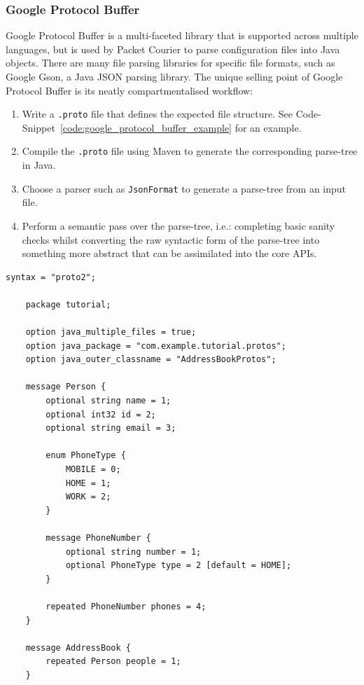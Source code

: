 \subsubsection{Google Protocol Buffer}\label{subsubsection:google_protocol_buffer}

Google Protocol Buffer\cite{google_protobuf} is a multi-faceted library that is supported across multiple languages,
but is used by Packet Courier to parse configuration files into Java objects. There are many file parsing libraries
for specific file formats, such as Google Gson, a Java JSON parsing library\cite{google_gson}. The unique selling
point of Google Protocol Buffer is its neatly compartmentalised workflow:
\begin{enumerate}
    \item Write a \texttt{.proto} file that defines the expected file structure. See
    Code-Snippet~\ref{code:google_protocol_buffer_example} for an example.
    \item Compile the \texttt{.proto} file using Maven to generate the corresponding parse-tree in Java.
    \item Choose a parser such as \texttt{JsonFormat} to generate a parse-tree from an input file.
    \item Perform a semantic pass over the parse-tree, i.e.: completing basic sanity checks whilst converting the
    raw syntactic form of the parse-tree into something more abstract that can be assimilated into the core APIs.
\end{enumerate}

\begin{lstlisting}[language=protobuf2,style=protobuf,caption={An example of a \texttt{.proto} file that encodes for
an \texttt{AddressBook}. A data file that followed this syntactic structure could then be read into memory as an
\texttt{AddressBookProtos} Java class, ready for further abstraction.},
    label={code:google_protocol_buffer_example},captionpos=b]
    syntax = "proto2";

    package tutorial;

    option java_multiple_files = true;
    option java_package = "com.example.tutorial.protos";
    option java_outer_classname = "AddressBookProtos";

    message Person {
        optional string name = 1;
        optional int32 id = 2;
        optional string email = 3;

        enum PhoneType {
            MOBILE = 0;
            HOME = 1;
            WORK = 2;
        }

        message PhoneNumber {
            optional string number = 1;
            optional PhoneType type = 2 [default = HOME];
        }

        repeated PhoneNumber phones = 4;
    }

    message AddressBook {
        repeated Person people = 1;
    }
\end{lstlisting}

